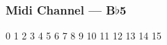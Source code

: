 \subsubsection{Midi Channel --- \UiKey{\SET}B$\flat$5}









































0
1
2
3
4
5
6
7
8
9
10
11
12
13
14
15

